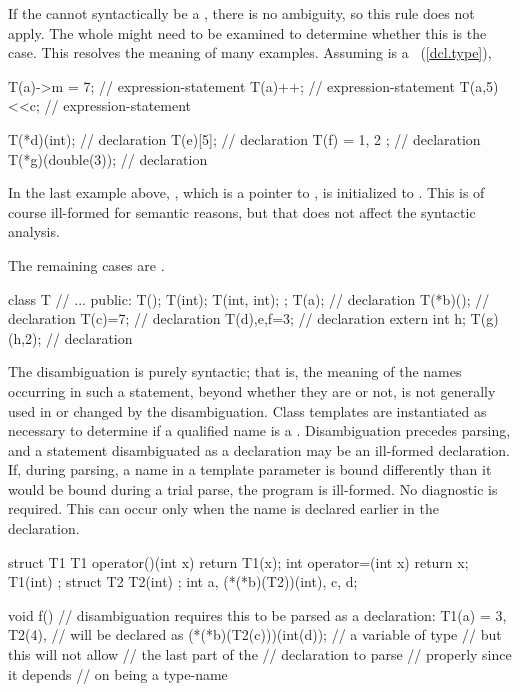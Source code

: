\pnum
\enternote
If the  cannot syntactically be a
, there is no ambiguity,
so this rule does not apply.
The whole  might need to be examined
to determine whether this is the case. This resolves the meaning
of many examples.
\enterexample
Assuming  is a
~(\ref{dcl.type}),

\begin{codeblock}
T(a)->m = 7;        // expression-statement
T(a)++;             // expression-statement
T(a,5)<<c;          // expression-statement

T(*d)(int);         //  declaration
T(e)[5];            //  declaration
T(f) = { 1, 2 };    //  declaration
T(*g)(double(3));   //  declaration
\end{codeblock}

In the last example above, , which is a pointer to ,
is initialized to . This is of course ill-formed for
semantic reasons, but that does not affect the syntactic analysis.
\exitexample

The remaining cases are .
\enterexample

\begin{codeblock}
class T {
  // ...
public:
  T();
  T(int);
  T(int, int);
};
T(a);               //  declaration
T(*b)();            //  declaration
T(c)=7;             //  declaration
T(d),e,f=3;         //  declaration
extern int h;
T(g)(h,2);          //  declaration
\end{codeblock}
\exitexample
\exitnote

\pnum
The disambiguation is purely syntactic; that is, the meaning of the
names occurring in such a statement, beyond whether they are
 or not, is not generally used in or changed by the
disambiguation. Class templates are instantiated as necessary to
determine if a qualified name is a . Disambiguation
precedes parsing, and a statement disambiguated as a declaration may be
an ill-formed declaration. If, during parsing, a name in a template
parameter is bound differently than it would be bound during a trial
parse, the program is ill-formed. No diagnostic is required.
\enternote
This can occur only when the name is declared earlier in the
declaration.
\exitnote
\enterexample

\begin{codeblock}
struct T1 {
  T1 operator()(int x) { return T1(x); }
  int operator=(int x) { return x; }
  T1(int) { }
};
struct T2 { T2(int){ } };
int a, (*(*b)(T2))(int), c, d;

void f() {
  // disambiguation requires this to be parsed as a declaration:
  T1(a) = 3,
  T2(4),                        //  will be declared as
  (*(*b)(T2(c)))(int(d));       // a variable of type 
                                // but this will not allow
                                // the last part of the
                                // declaration to parse
                                // properly since it depends
                                // on  being a type-name
}
\end{codeblock}
\exitexample%
